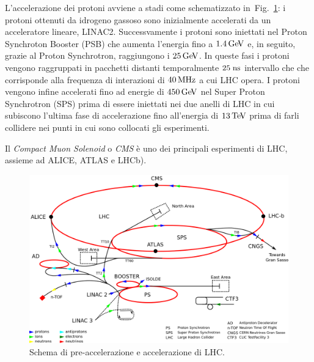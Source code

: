 L'accelerazione dei protoni avviene a stadi come schematizzato in~Fig.~\ref{fig:LHC}: i protoni ottenuti da idrogeno gassoso sono inizialmente accelerati da un acceleratore lineare, LINAC2. Successvamente i protoni sono iniettati nel Proton Synchroton Booster (PSB) che aumenta l'energia fino a $1.4{\rm \, Ge\kern-0.125em V}$ e, in seguito, grazie al Proton Synchrotron, raggiungono i $25{\rm \, Ge\kern-0.125em V}$. In queste fasi i protoni vengono raggruppati in pacchetti distanti temporalmente $25\rm \; ns$ intervallo che che corrisponde alla frequenza di interazioni di $40{\rm \, MHz}$ a cui LHC opera. 
I protoni vengono infine accelerati fino ad energie di $450{\rm \, Ge\kern-0.125em V}$ nel Super Proton Synchrotron (SPS) prima di essere iniettati nei due anelli di LHC in cui subiscono l'ultima fase di accelerazione fino all'energia di $13{\rm \, Te\kern-0.125em V}$ prima di farli collidere nei punti in cui sono collocati gli esperimenti.

Il {\em Compact Muon Solenoid} o {\em CMS} \cite{CMS} è uno dei principali esperimenti di LHC, assieme ad ALICE, ATLAS e LHCb)\cite{ALICE,ATLAS,LHCb}. 

\begin{figure}
\centering
\includegraphics[scale=0.25]{Immagini/LHC}
\caption{Schema di pre-accelerazione e accelerazione di LHC.}
\label{fig:LHC}
\end{figure}

